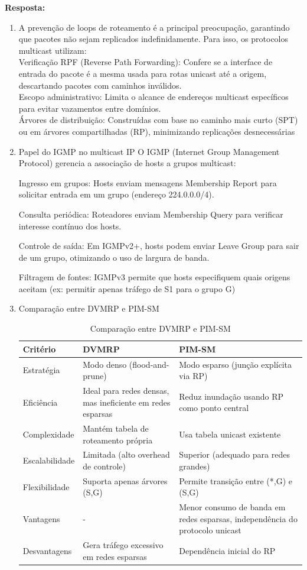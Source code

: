\textbf{Resposta:}
\begin{enumerate}[label=\alph*.]
    \item A prevenção de loops de roteamento é a principal preocupação, garantindo que pacotes não sejam replicados indefinidamente. Para isso, os protocolos multicast utilizam:\\
Verificação RPF (Reverse Path Forwarding): Confere se a interface de entrada do pacote é a mesma usada para rotas unicast até a origem, descartando pacotes com caminhos inválidos.\\
Escopo administrativo: Limita o alcance de endereços multicast específicos para evitar vazamentos entre domínios.\\
Árvores de distribuição: Construídas com base no caminho mais curto (SPT) ou em árvores compartilhadas (RP), minimizando replicações desnecessárias\\

\item Papel do IGMP no multicast IP
O IGMP (Internet Group Management Protocol) gerencia a associação de hosts a grupos multicast:

Ingresso em grupos: Hosts enviam mensagens Membership Report para solicitar entrada em um grupo (endereço 224.0.0.0/4).

Consulta periódica: Roteadores enviam Membership Query para verificar interesse contínuo dos hosts.

Controle de saída: Em IGMPv2+, hosts podem enviar Leave Group para sair de um grupo, otimizando o uso de largura de banda.

Filtragem de fontes: IGMPv3 permite que hosts especifiquem quais origens aceitam (ex: permitir apenas tráfego de S1 para o grupo G)

\item Comparação entre DVMRP e PIM-SM
\begin{table}[ht]
\centering
\caption{Comparação entre DVMRP e PIM-SM}
\label{tab:multicast}
\begin{tabular}{|l|p{6cm}|p{6cm}|}
\hline
\textbf{Critério} & \textbf{DVMRP} & \textbf{PIM-SM} \\ 
\hline
Estratégia & Modo denso (flood-and-prune) & Modo esparso (junção explícita via RP) \\
\hline
Eficiência & Ideal para redes densas, mas ineficiente em redes esparsas & Reduz inundação usando RP como ponto central \\
\hline
Complexidade & Mantém tabela de roteamento própria & Usa tabela unicast existente \\
\hline
Escalabilidade & Limitada (alto overhead de controle) & Superior (adequado para redes grandes) \\
\hline
Flexibilidade & Suporta apenas árvores (S,G) & Permite transição entre (*,G) e (S,G) \\
\hline
Vantagens & - & Menor consumo de banda em redes esparsas, independência do protocolo unicast \\
\hline
Desvantagens & Gera tráfego excessivo em redes esparsas & Dependência inicial do RP \\
\hline
\end{tabular}
\end{table}
\newpage


\end{enumerate}
